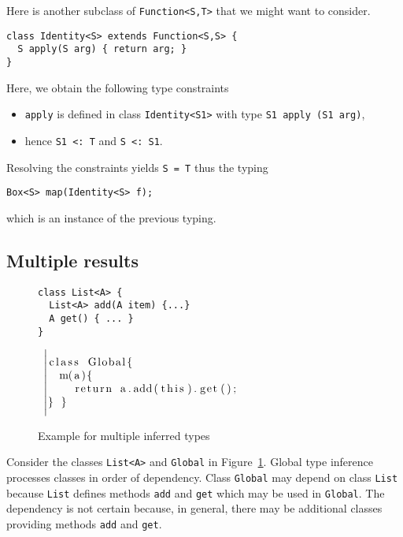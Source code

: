 Here is another subclass of \texttt{Function<S,T>} that we might want
to consider.
\begin{lstlisting}
class Identity<S> extends Function<S,S> {
  S apply(S arg) { return arg; }
}
\end{lstlisting}
Here, we obtain the following type constraints
\begin{itemize}
\item \texttt{apply} is defined in class \texttt{Identity<S1>} with
  type \texttt{S1 apply (S1 arg)},
\item hence \texttt{S1 <: T} and \texttt{S <: S1}.
\end{itemize}
Resolving the constraints yields \texttt{S = T} thus the typing
\begin{lstlisting}
Box<S> map(Identity<S> f);
\end{lstlisting}
which is an instance of the previous typing.

\subsection{Multiple results}
\label{sec:multiple-results}
\begin{figure}[tp]
  \begin{minipage}{0.49\linewidth}
\begin{lstlisting}
class List<A> {
  List<A> add(A item) {...}
  A get() { ... }
}
\end{lstlisting}
  \end{minipage}
  ~$\left|
  \begin{minipage}{0.49\linewidth}
\begin{lstlisting}
class Global{
  m(a){
    return a.add(this).get();
} }
\end{lstlisting}
  \end{minipage}\right.$
  \caption{Example for multiple inferred types}
  \label{fig:example-types-not-unique}
\end{figure}
Consider the classes \texttt{List<A>} and \texttt{Global} in Figure~\ref{fig:example-types-not-unique}.
Global type inference processes classes in order of
dependency. Class \texttt{Global} may depend on
class \texttt{List} because \texttt{List} defines methods \texttt{add} and
\texttt{get} which may be used in \texttt{Global}. The dependency is
not certain because, in general, there may be additional classes
providing methods \texttt{add} and \texttt{get}.

